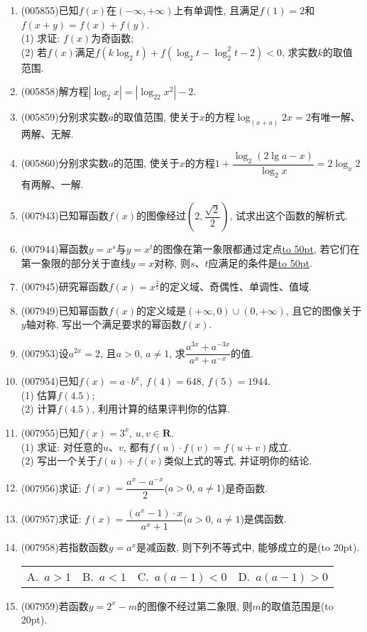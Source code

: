 \documentclass[10pt,a4paper]{article}
\newcommand{\blank}[1]{\underline{\hbox to #1pt{}}}
\newcommand{\bracket}[1]{(\hbox to #1pt{})}
\newcommand{\fourch}[4]{\par\begin{tabular}{p{.23\textwidth}p{.23\textwidth}p{.23\textwidth}p{.23\textwidth}}
A.~#1 &B.~#2& C.~#3& D.~#4
\end{tabular}}
\begin{document}
\begin{enumerate}[1.]
\item {\tiny (005855)}已知$f(x)$在$(-\infty ,+\infty)$上有单调性, 且满足$f(1)=2$和$f(x+y)=f(x)+f(y)$.\\
(1) 求证: $f(x)$为奇函数;\\
(2) 若$f(x)$满足$f(k\log_2t)+f(\log_2t-\log_2^2t-2)<0$, 求实数$k$的取值范围.
\item {\tiny (005858)}解方程$|\log_2x|=|\log_22x^2|-2$.
\item {\tiny (005859)}分别求实数$a$的取值范围, 使关于$x$的方程$\log_{(x+a)}2x=2$有唯一解、两解、无解.
\item {\tiny (005860)}分别求实数$a$的范围, 使关于$x$的方程$1+\dfrac{\log_2(2\lg a-x)}{\log_2x}=2\log_x2$有两解、一解.
\item {\tiny (007943)}已知幂函数$f(x)$的图像经过$(2,\dfrac{\sqrt 2}2)$, 试求出这个函数的解析式.
\item {\tiny (007944)}幂函数$y=x^s$与$y=x^t$的图像在第一象限都通过定点\blank{50}, 若它们在第一象限的部分关于直线$y=x$对称, 则$s$、$t$应满足的条件是\blank{50}.
\item {\tiny (007945)}研究幂函数$f(x)=x^{\frac 25}$的定义域、奇偶性、单调性、值域.
\item {\tiny (007949)}已知幂函数$f(x)$的定义域是$(+\infty ,0)\cup (0,+\infty)$, 且它的图像关于$y$轴对称, 写出一个满足要求的幂函数$f(x)$.
\item {\tiny (007953)}设$a^{2x}=2$, 且$a>0$, $a\ne 1$, 求$\dfrac{a^{3x}+a^{-3x}}{a^x+a^{-x}}$的值.
\item {\tiny (007954)}已知$f(x)=a\cdot b^x$, $f(4)=648$, $f(5)=1944$.\\
(1) 估算$f(4.5)$;\\
(2) 计算$f(4.5)$, 利用计算的结果评判你的估算.
\item {\tiny (007955)}已知$f(x)=3^x$, $u,v\in \mathbf{R}$.\\
(1) 求证: 对任意的$u$、$v$, 都有$f(u)\cdot f(v)=f(u+v)$成立.\\
(2) 写出一个关于$f(u)\div f(v)$类似上式的等式, 并证明你的结论.
\item {\tiny (007956)}求证: $f(x)=\dfrac{a^x-a^{-x}}2$($a>0$, $a\ne 1$)是奇函数.
\item {\tiny (007957)}求证: $f(x)=\dfrac{(a^x-1)\cdot x}{a^x+1}$($a>0$, $a\ne 1$)是偶函数.
\item {\tiny (007958)}若指数函数$y=a^x$是减函数, 则下列不等式中, 能够成立的是\bracket{20}.
\fourch{$a>1$}{$a<1$}{$a(a-1)<0$}{$a(a-1)>0$}
\item {\tiny (007959)}若函数$y=2^x-m$的图像不经过第二象限, 则$m$的取值范围是\bracket{20}.

\end{enumerate}
\end{document}
